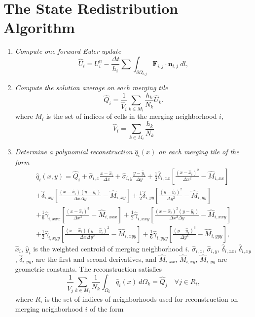 \section{The State Redistribution Algorithm}\label{sec:srdAlg}
\begin{enumerate}[label=Step \arabic*:]
    \item \textit{Compute one forward Euler update}
    \begin{equation} 
    \hat{U}_i = U^n_i - \frac{\Delta t}{h_i}\sum \int_{\partial \Omega_{i,j}} \mathbf{F}_{i,j} \cdot \mathbf{n}_{i,j}~dl,\label{eq:scheme}
    \end{equation}
	\item \textit{Compute the solution average on each merging tile}
	\begin{equation}\label{eq:q_avg1}
	    \hat Q_i =  \frac{1}{\hat V_i}\sum_{k \in M_i}\frac{h_k}{N_k} \hat U_k.
	\end{equation}
	where $M_i$ is the set of indices of cells in the merging neighborhood $i$, 
	\begin{equation}\label{eq:modV}
	\hat V_i = \sum_{k \in M_i}\frac{h_k}{N_k}
	\end{equation}
\item \textit{Determine a polynomial reconstruction $\hat q_i(x)$ on each merging tile of the form}
\begin{equation}\label{eq:q}
\begin{aligned}
	    \hat q_i(x,y) = \hat Q_{i} + \hat \sigma_{i,x}\frac{x-\hat x_i}{\Delta x} +  \hat \sigma_{i,y}\frac{y-\hat y_i}{\Delta y} + \frac{1}{2}\hat \delta_{i, xx}\left[ \frac{(x - \hat x_i)^2 }{\Delta x^2} - \hat M_{i,xx}\right]\\
	    +\hat \delta_{i, xy}\left[ \frac{(x - \hat x_i) (y - \hat y_i) }{\Delta x \Delta y} - \hat M_{i,xy}\right] + \frac{1}{2}\hat \delta_{i, yy}\left[ \frac{(y - \hat y_i)^2 }{\Delta y^2} -  \hat M_{i,yy}\right]\\
	    + \frac{1}{6}\hat\gamma_{i, xxx}\left[ \frac{(x -  \hat x_i)^3 }{\Delta x^3} -  \hat M_{i,xxx}\right] + \frac{1}{2}\hat \gamma_{i, xxy}\left[ \frac{(x - \hat x_i)^2 (y -  \hat y_i) }{\Delta x^2 \Delta y} -  \hat M_{i,xxy}\right]\\
	     + \frac{1}{2}\hat \gamma_{i, xyy}\left[ \frac{(x -  \hat x_i) (y -  \hat y_i)^2 }{\Delta x \Delta y ^2} -  \hat M_{i,xyy}\right]+ \frac{1}{6}\hat \gamma_{i, yyy}\left[ \frac{(y -  \hat y_i)^3 }{\Delta y^3} -  \hat M_{i,yyy}\right],
\end{aligned}
\end{equation}
$\hat x_i$, $\hat y_i$ is the weighted centroid of merging neighborhood $i$. $\hat \sigma_{i,x}$, $\hat \sigma_{i,y}$, $\hat \delta_{i,xx}$, $\hat \delta_{i,xy}$, $\hat \delta_{i,yy}$, are the first and second derivatives, and $ \hat M_{i,xx}$, $\hat M_{i,xy}$,  $\hat M_{i,yy}$ are geometric constants.  The reconstruction satisfies
\begin{equation}\label{eq:qi}
\frac{1}{\hat V_j}\sum_{k \in M_j}\frac{1}{N_k}\int_{\Omega_k} \hat q_i(x)~d\Omega_k = \hat Q_j \quad \forall j \in R_i,
\end{equation}
where $R_i$ is the set of indices of neighborhoods used for reconstruction on merging neighborhood $i$ of the form



\end{enumerate}
